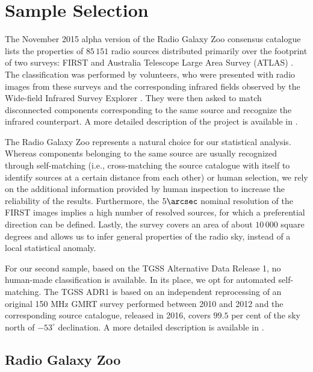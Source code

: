 \section{Sample Selection}
	\label{sec:SS}
	The November 2015 alpha version of the Radio Galaxy Zoo consensus catalogue lists the properties of $85\,151$ radio sources distributed primarily over the footprint of two surveys: FIRST and Australia Telescope Large Area Survey (ATLAS) \citep{Norris2006}. The classification was performed by volunteers, who were presented with radio images from these surveys and the corresponding infrared fields observed by the Wide-field Infrared Survey Explorer \citep[WISE;][]{Wright2010}. They were then asked to match disconnected components corresponding to the same source and recognize the infrared counterpart. A more detailed description of the project is available in \cite{Banfield2015}. 

	The Radio Galaxy Zoo represents a natural choice for our statistical analysis. Whereas components belonging to the same source are usually recognized through self-matching (i.e., cross-matching the source catalogue with itself to identify sources at a certain distance from each other) or human selection, we rely on the additional information provided by human inspection to increase the reliability of the results. Furthermore, the $5\arcsec$ nominal resolution of the FIRST images implies a high number of resolved sources, for which a preferential direction can be defined. Lastly,  the survey covers an area of about $10\,000$ square degrees and allows us to infer general properties of the radio sky, instead of a local statistical anomaly.

	For our second sample, based on the TGSS Alternative Data Release 1, no human-made classification is available. In its place, we opt for automated self-matching. The TGSS ADR1 is based on an independent reprocessing of an original 150 MHz GMRT survey performed between 2010 and 2012 and the corresponding source catalogue, released in 2016, covers $99.5$  per cent of the sky north of $-53^\circ$ declination. A more detailed description is available in \cite{Intema2016}.
	
	\subsection{Radio Galaxy Zoo}
	
